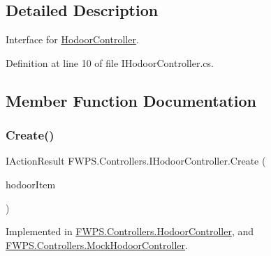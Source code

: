 \subsection{Detailed Description}
Interface for \mbox{\hyperlink{class_f_w_p_s_1_1_controllers_1_1_hodoor_controller}{Hodoor\+Controller}}. 

Definition at line 10 of file I\+Hodoor\+Controller.\+cs.



\subsection{Member Function Documentation}
\mbox{\label{interface_f_w_p_s_1_1_controllers_1_1_i_hodoor_controller_af4ec9b2bea258465475226f9693e26b3}} 
\subsubsection{\texorpdfstring{Create()}{Create()}}
{\footnotesize\ttfamily I\+Action\+Result F\+W\+P\+S.\+Controllers.\+I\+Hodoor\+Controller.\+Create (\begin{DoxyParamCaption}\item[{\mbox{[}\+From\+Body\mbox{]} \mbox{\hyperlink{class_f_w_p_s_1_1_models_1_1_hodoor_item}{Hodoor\+Item}}}]{hodoor\+Item }\end{DoxyParamCaption})}



Implemented in \mbox{\hyperlink{class_f_w_p_s_1_1_controllers_1_1_hodoor_controller_a10c4a8b451c2ed13e161beca8341e5dc}{F\+W\+P\+S.\+Controllers.\+Hodoor\+Controller}}, and \mbox{\hyperlink{class_f_w_p_s_1_1_controllers_1_1_mock_hodoor_controller_a5c7260d565b73f5aad4dc5cc408a8dc0}{F\+W\+P\+S.\+Controllers.\+Mock\+Hodoor\+Controller}}.

\mbox{\label{interface_f_w_p_s_1_1_controllers_1_1_i_hodoor_controller_a8fe985f1171b270cd663c1e16bb198ee}} 
